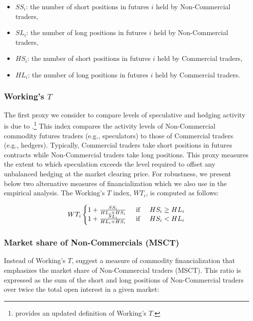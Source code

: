 \begin{itemize}
\item $SS_i$: the number of short positions in  futures $i$  held by Non-Commercial traders,
\item $SL_i$: the number of long positions in  futures $i$  held by Non-Commercial traders,
\item $HS_i$: the number of short positions in  futures $i$  held by Commercial traders, 
\item $HL_i$: the number of long positions in  futures $i$  held by Commercial traders.
\end{itemize}

\subsubsection{Working's $T$}
The first proxy we consider to  compare levels of speculative and hedging activity is due to \citet{working1960speculation}.\footnote{\citet{shanker2017new} provides an updated definition of Working's $T$.} This index compares the activity levels of Non-Commercial commodity futures traders (e.g., speculators) to those of Commercial traders (e.g., hedgers). Typically, Commercial traders take short positions in futures contracts while Non-Commercial traders take long positions. This proxy measures the extent to which speculation exceeds the level required to offset any unbalanced hedging at the market clearing price. For robustness, we present below two alternative measures of financialization which we also use in the empirical analysis. The Working's $T$ index, $WT_i$, is computed as follows:


\begin{equation} \label{eqn:Working}
 WT_i\left\{\begin{matrix}
 1+\frac{SS_i}{HL_i+HS_i} \hspace{0.5cm} \mbox{if} \hspace{0.5cm} HS_i \ge HL_i\\
1+\frac{SL_i}{HL_i+HS_i} \hspace{0.5cm} \mbox{if} \hspace{0.5cm} HS_i < HL_i
\end{matrix}\right.
\end{equation}


\subsubsection{Market share of Non-Commercials (MSCT)}
Instead of Working's $T$, \citet*{buyukcsahin2014speculators} suggest a measure of commodity financialization that emphasizes the market share of Non-Commercial traders (MSCT). This ratio is expressed as  the sum of the short and long positions of Non-Commercial traders over twice the total open interest in a given market: 



